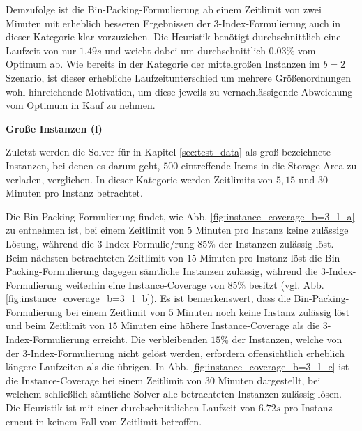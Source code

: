Demzufolge ist die Bin-Packing-Formulierung ab einem Zeitlimit von zwei Minuten mit erheblich besseren Ergebnissen der 3-Index-Formulierung auch in dieser Kategorie klar vorzuziehen.
Die Heuristik benötigt durchschnittlich eine Laufzeit von nur $1.49s$ und weicht dabei um durchschnittlich
$0.03 \%$ vom Optimum ab. Wie bereits in der Kategorie der mittelgroßen Instanzen im $b = 2$ Szenario, ist dieser erhebliche Laufzeitunterschied um mehrere Größenordnungen wohl hinreichende Motivation, um diese jeweils zu vernachlässigende Abweichung vom Optimum in Kauf zu nehmen.

\vfill
\pagebreak

\textbf{Große Instanzen (l)}

Zuletzt werden die Solver für in Kapitel \ref{sec:test_data} als groß bezeichnete Instanzen,
bei denen es darum geht, $500$ eintreffende Items in die Storage-Area zu verladen, verglichen.
In dieser Kategorie werden Zeitlimits von $5, 15$ und $30$ Minuten pro Instanz betrachtet.

Die Bin-Packing-Formulierung findet, wie Abb. \ref{fig:instance_coverage_b=3_l_a} zu entnehmen ist,
bei einem Zeitlimit von $5$ Minuten pro Instanz keine zulässige Lösung, während die 3-Index-Formulie\-/rung
$85 \%$ der Instanzen zulässig löst. Beim nächsten betrachteten Zeitlimit von $15$ Minuten pro Instanz löst die Bin-Packing-Formulierung dagegen sämtliche Instanzen zulässig, während die 3-Index-Formulierung weiterhin eine Instance-Coverage von $85 \%$ besitzt (vgl. Abb. \ref{fig:instance_coverage_b=3_l_b}). Es ist bemerkenswert, dass die Bin-Packing-Formulierung bei einem Zeitlimit von $5$ Minuten noch keine Instanz zulässig löst und beim Zeitlimit
von $15$ Minuten eine höhere Instance-Coverage als die 3-Index-Formulierung erreicht. Die verbleibenden $15 \%$ der
Instanzen, welche von der 3-Index-Formulierung nicht gelöst werden, erfordern offensichtlich erheblich längere Laufzeiten als die übrigen. In Abb. \ref{fig:instance_coverage_b=3_l_c} ist die Instance-Coverage bei einem Zeitlimit von $30$ Minuten dargestellt, bei welchem schließlich sämtliche Solver alle betrachteten Instanzen zulässig lösen. Die Heuristik ist mit einer durchschnittlichen Laufzeit von $6.72s$ pro Instanz erneut in keinem Fall vom Zeitlimit betroffen.

